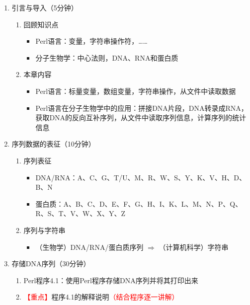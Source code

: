\documentclass{TIJMUjiaoanLL}
\begin{document}
\firstTail

\newpage
\otherHeader

\begin{enumerate}
  \item 引言与导入（5分钟）
    \begin{enumerate}
      \item 回顾知识点
	\begin{itemize}
	  \item Perl语言：变量，字符串操作符，……
	  \item 分子生物学：中心法则，DNA、RNA和蛋白质
	\end{itemize}
      \item 本章内容
	\begin{itemize}
	  \item Perl语言：标量变量，数组变量，字符串操作，从文件中读取数据
	  \item Perl语言在分子生物学中的应用：拼接DNA片段，DNA转录成RNA，获取DNA的反向互补序列，从文件中读取序列信息，计算序列的统计信息
	\end{itemize}
    \end{enumerate}
  \item 序列数据的表征（10分钟）
    \begin{enumerate}
      \item 序列表征
	\begin{itemize}
	  \item DNA/RNA：A、C、G、T/U、M、R、W、S、Y、K、V、H、D、B、N
	  \item 蛋白质：A、B、C、D、E、F、G、H、I、K、L、M、N、P、Q、R、S、T、V、W、X、Y、Z
	\end{itemize}
      \item 序列与字符串
	\begin{itemize}
	  \item （生物学）DNA/RNA/蛋白质序列 $\Longrightarrow$ （计算机科学）字符串
	\end{itemize}
    \end{enumerate}
  \item 存储DNA序列（30分钟）
    \begin{enumerate}
      \item Perl程序4.1：使用Perl程序存储DNA序列并将其打印出来
      \item \textcolor{red}{【重点】}程序4.1的解释说明\textcolor{red}{（结合程序逐一讲解）}
\vspace*{-1em}
\begin{multicols}{2}

\end{multicols}
\end{enumerate}
\end{enumerate}
\end{document}
